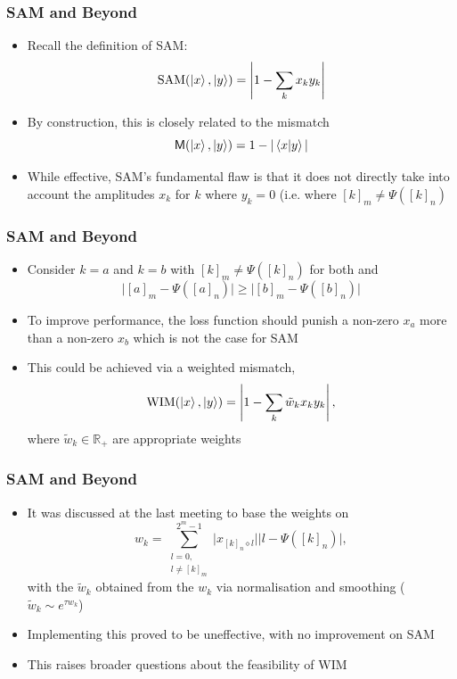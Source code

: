 \documentclass{beamer}
\begin{document}
\begin{frame}
\frametitle{SAM and Beyond}
\begin{itemize}
\item Recall the definition of \alert{SAM}:
\begin{equation}
\text{SAM}(\ket{x}, \ket{y}) = \left\vert 1 - \sum_k x_k y_k \right\vert 
\end{equation}
\item By construction, this is closely related to the \alert{mismatch} 
\begin{equation}
\mathsf{M}(\ket{x}, \ket{y}) = 1 - |\braket{x|y}|
\end{equation}
\item While effective, SAM's \alert{fundamental flaw} is that it does not directly take into account the amplitudes $x_k$ for $k$ where $y_k =0$ (i.e. where $[k]_m \neq \Psi([k]_n)$
\end{itemize}
\end{frame}

\begin{frame}
\frametitle{SAM and Beyond}
\begin{itemize}
\item Consider $k=a$ and $k=b$ with $[k]_m \neq \Psi([k]_n)$ for both and 
\begin{equation}
\Big|[a]_m - \Psi([a]_n) \Big| \geq \Big|[b]_m - \Psi([b]_n) \Big| 
\end{equation}
\item To improve performance, the loss function should punish a non-zero $x_a$ more than a non-zero $x_b$ which is not the case for SAM
\item This could be achieved via a \alert{weighted mismatch}, 
\begin{equation}
\text{WIM}(\ket{x}, \ket{y}) = \left\vert 1 - \sum_k \tilde{w}_k x_k y_k \right\vert, 
\end{equation}
where $\tilde{w}_k \in \mathbb{R}_+$ are appropriate weights
\end{itemize}
\end{frame}

\begin{frame}
\frametitle{SAM and Beyond}
\begin{itemize}
\item It was discussed at the last meeting to base the weights on
\begin{equation}
w_k = \sum^{2^m -1}_{\substack{l=0, \\ l \neq [k]_m}} \Big|x_{[k]_n \diamond l} \Big| \Big| l - \Psi([k]_n) \Big|,
\end{equation}
with the $\tilde{w}_k$ obtained from the $w_k$ via normalisation and smoothing ($\tilde{w}_k \sim e^{\tau w_k}$)
\item Implementing this \alert{proved to be uneffective}, with no improvement on SAM  
\item This raises broader questions about the \alert{feasibility of WIM}
\end{itemize}
\end{frame}
\end{document}
